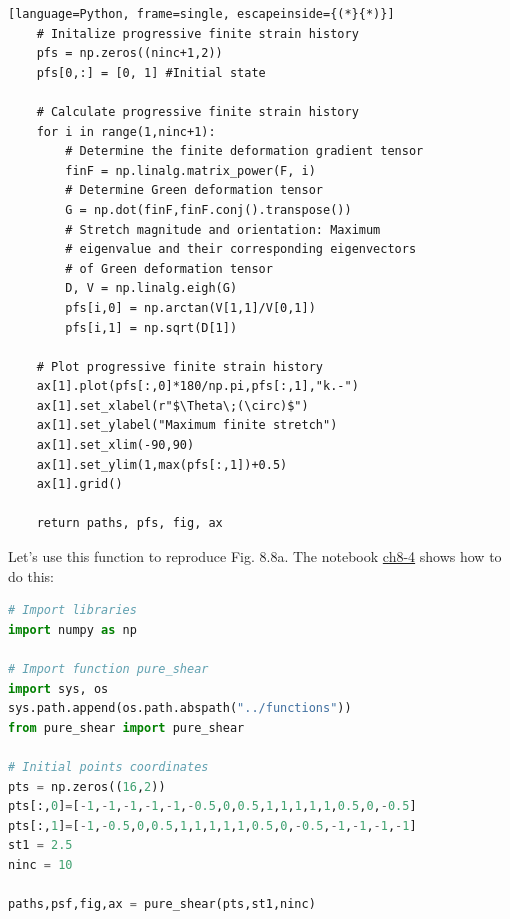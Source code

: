 \documentclass[a4paper , 12pt]{book}
\begin{document}
\begin{center}
\begin{lstlisting}[language=Python, frame=single, escapeinside={(*}{*)}]
	# Initalize progressive finite strain history
	pfs = np.zeros((ninc+1,2))
	pfs[0,:] = [0, 1] #Initial state
	
	# Calculate progressive finite strain history
	for i in range(1,ninc+1):
		# Determine the finite deformation gradient tensor
		finF = np.linalg.matrix_power(F, i)
		# Determine Green deformation tensor
		G = np.dot(finF,finF.conj().transpose())
		# Stretch magnitude and orientation: Maximum 
		# eigenvalue and their corresponding eigenvectors
		# of Green deformation tensor
		D, V = np.linalg.eigh(G)
		pfs[i,0] = np.arctan(V[1,1]/V[0,1])
		pfs[i,1] = np.sqrt(D[1])
	
	# Plot progressive finite strain history
	ax[1].plot(pfs[:,0]*180/np.pi,pfs[:,1],"k.-")
	ax[1].set_xlabel(r"$\Theta\;(\circ)$")
	ax[1].set_ylabel("Maximum finite stretch")
	ax[1].set_xlim(-90,90)
	ax[1].set_ylim(1,max(pfs[:,1])+0.5)
	ax[1].grid()
	
	return paths, pfs, fig, ax
\end{lstlisting}
\end{center}

Let's use this function to reproduce Fig. 8.8a. The notebook \href{https://github.com/nfcd/compGeo/blob/master/source/notebooks/ch8-4.ipynb}{ch8-4} shows how to do this:

\begin{center}
\begin{lstlisting}[language=Python, frame=single]
# Import libraries
import numpy as np

# Import function pure_shear
import sys, os
sys.path.append(os.path.abspath("../functions"))
from pure_shear import pure_shear

# Initial points coordinates
pts = np.zeros((16,2))
pts[:,0]=[-1,-1,-1,-1,-1,-0.5,0,0.5,1,1,1,1,1,0.5,0,-0.5]
pts[:,1]=[-1,-0.5,0,0.5,1,1,1,1,1,0.5,0,-0.5,-1,-1,-1,-1]
st1 = 2.5
ninc = 10

paths,psf,fig,ax = pure_shear(pts,st1,ninc)
\end{lstlisting}
\end{center}
\end{document}
